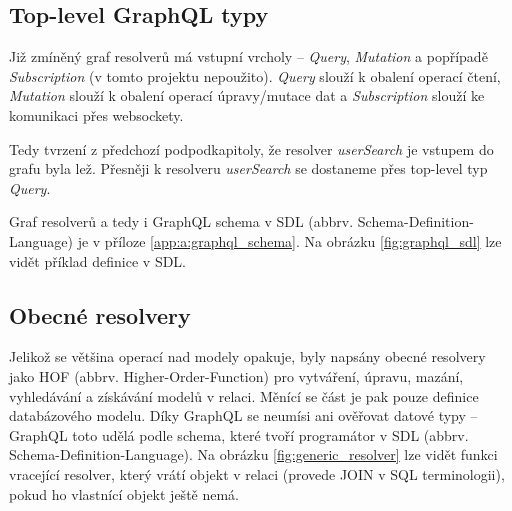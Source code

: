\subsection{Top-level GraphQL typy}

\noindent
Již zmíněný graf resolverů má vstupní vrcholy -- \textit{Query}, \textit{Mutation} a popřípadě \textit{Subscription} (v tomto projektu nepoužito).
\textit{Query} slouží k obalení operací čtení, \textit{Mutation} slouží k obalení operací úpravy/mutace dat a \textit{Subscription} slouží
ke komunikaci přes websockety. \citep{GraphQLDoc} \citep{ApolloSubs}

Tedy tvrzení z předchozí podpodkapitoly, že resolver \textit{userSearch} je vstupem do grafu byla lež.
Přesněji k resolveru \textit{userSearch} se dostaneme přes top-level typ \textit{Query}.

Graf resolverů a tedy i GraphQL schema v SDL (abbrv. Schema-Definition-Language) je v příloze \ref{app:a:graphql_schema}.
Na obrázku \ref{fig:graphql_sdl} lze vidět příklad definice v SDL.

\subsection{Obecné resolvery}

\noindent
Jelikož se většina operací nad modely opakuje, byly napsány obecné resolvery jako HOF (abbrv. Higher-Order-Function)
pro vytváření, úpravu, mazání, vyhledávání a získávání modelů v relaci.
Měnící se část je pak pouze definice databázového modelu. Díky GraphQL se neumísi ani ověřovat datové typy --
GraphQL toto udělá podle schema, které tvoří programátor v SDL (abbrv. Schema-Definition-Language).
Na obrázku \ref{fig:generic_resolver} lze vidět funkci vracející resolver, který vrátí objekt v relaci
(provede JOIN v SQL terminologii), pokud ho vlastnící objekt ještě nemá.


